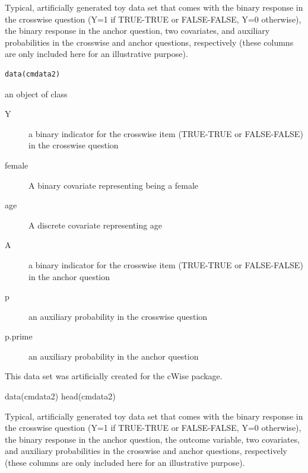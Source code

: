 \documentclass[a4paper]{book}
\begin{document}
%
\begin{Description}
Typical, artificially generated toy data set that comes with the binary response in the crosswise question (Y=1 if TRUE-TRUE or FALSE-FALSE, Y=0 otherwise),
the binary response in the anchor question, two covariates, and auxiliary probabilities in the crosswise and anchor questions, respectively (these columns are only included here for an illustrative purpose).
\end{Description}
%
\begin{Usage}
\begin{verbatim}
data(cmdata2)
\end{verbatim}
\end{Usage}
%
\begin{Format}
an object of class 
\begin{description}

\item[Y] a binary indicator for the crosswise item (TRUE-TRUE or FALSE-FALSE) in the crosswise question
\item[female] A binary covariate representing being a female
\item[age] A discrete covariate representing age
\item[A] a binary indicator for the crosswise item (TRUE-TRUE or FALSE-FALSE) in the anchor question
\item[p] an auxiliary probability in the crosswise question
\item[p.prime] an auxiliary probability in the anchor question

\end{description}

\end{Format}
%
\begin{References}
This data set was artificially created for the cWise package.
\end{References}
%
\begin{Examples}
\begin{ExampleCode}

data(cmdata2)
head(cmdata2)

\end{ExampleCode}
\end{Examples}
%
\begin{Description}
Typical, artificially generated toy data set that comes with the binary response in the crosswise question (Y=1 if TRUE-TRUE or FALSE-FALSE, Y=0 otherwise),
the binary response in the anchor question, the outcome variable, two covariates, and auxiliary probabilities in the crosswise and anchor questions, respectively (these columns are only included here for an illustrative purpose).
\end{Description}
\end{document}
